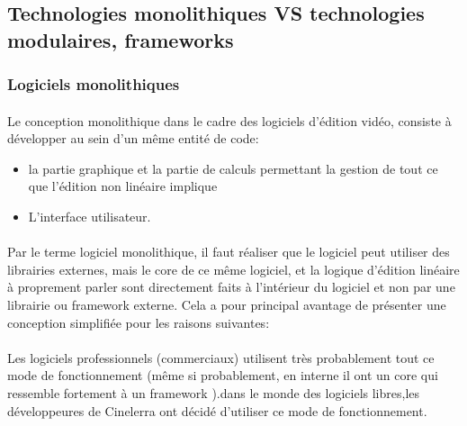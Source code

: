 \subsection {Technologies monolithiques VS technologies
modulaires, frameworks}


\subsubsection{Logiciels monolithiques } %

\paragraph{}

Le conception monolithique  dans le cadre des
logiciels d'édition vidéo, consiste à développer au sein d'un même
entité de code:

\begin{itemize} \setlength{\itemsep}{2mm}

  \item {la partie graphique et la partie de calculs
    permettant la gestion de tout ce que l'édition non linéaire
    implique}

  \item {L'interface utilisateur.}

\end {itemize}

\paragraph{}

Par le terme logiciel monolithique, il faut
réaliser que le logiciel peut utiliser des librairies externes,
mais le core de ce même logiciel, et la logique d'édition linéaire
à proprement parler sont directement faits à l'intérieur du logiciel
et non par une librairie ou framework  externe. Cela a
pour principal avantage de présenter une conception simplifiée pour les
raisons suivantes:

\paragraph{}

Les logiciels professionnels (commerciaux) utilisent très probablement
tout ce mode de fonctionnement (même si probablement, en interne il ont
un core qui ressemble fortement à un framework ).dans le
monde des logiciels libres,les développeures de Cinelerra ont décidé
d'utiliser ce mode de fonctionnement.

